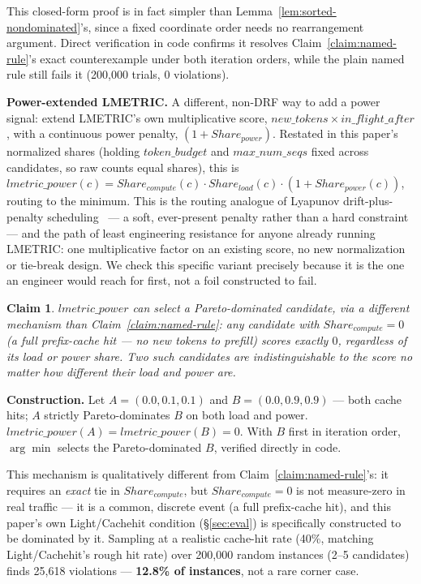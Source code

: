 \documentclass[sigconf,review,anonymous]{acmart}
\newtheorem{claim}{Claim}
\begin{document}
This closed-form proof is in fact simpler than Lemma~\ref{lem:sorted-nondominated}'s, since a
fixed coordinate order needs no rearrangement argument. Direct verification in code confirms
it resolves Claim~\ref{claim:named-rule}'s exact counterexample under both iteration orders,
while the plain named rule still fails it (200{,}000 trials, 0 violations).

\textbf{Power-extended LMETRIC.} A different, non-DRF way to add a power signal: extend
LMETRIC's own multiplicative score, $\mathit{new\_tokens} \times \mathit{in\_flight\_after}$,
with a continuous power penalty, $(1 + \mathit{Share_{power}})$. Restated in this paper's
normalized shares (holding $\mathit{token\_budget}$ and $\mathit{max\_num\_seqs}$ fixed
across candidates, so raw counts equal shares), this is $\mathit{lmetric\_power}(c) =
\mathit{Share_{compute}}(c) \cdot \mathit{Share_{load}}(c) \cdot (1 +
\mathit{Share_{power}}(c))$, routing to the minimum. This is the routing analogue of Lyapunov
drift-plus-penalty scheduling~\cite{neely2010stochastic} --- a soft, ever-present penalty
rather than a hard constraint --- and the path of least engineering resistance for anyone
already running LMETRIC: one multiplicative factor on an existing score, no new normalization
or tie-break design. We check this specific variant precisely because it is the one an
engineer would reach for first, not a foil constructed to fail.

\begin{claim}
\label{claim:lmetric-power}
$\mathit{lmetric\_power}$ can select a Pareto-dominated candidate, via a different mechanism
than Claim~\ref{claim:named-rule}: any candidate with $\mathit{Share_{compute}} = 0$ (a full
prefix-cache hit --- no new tokens to prefill) scores exactly $0$, \emph{regardless of its
load or power share}. Two such candidates are indistinguishable to the score no matter how
different their load and power are.
\end{claim}

\textbf{Construction.} Let $A = (0.0, 0.1, 0.1)$ and $B = (0.0, 0.9, 0.9)$ --- both cache
hits; $A$ strictly Pareto-dominates $B$ on both load and power.
$\mathit{lmetric\_power}(A) = \mathit{lmetric\_power}(B) = 0$. With $B$ first in iteration
order, $\arg\min$ selects the Pareto-dominated $B$, verified directly in code.

This mechanism is qualitatively different from Claim~\ref{claim:named-rule}'s: it requires an
\emph{exact} tie in $\mathit{Share_{compute}}$, but $\mathit{Share_{compute}} = 0$ is not
measure-zero in real traffic --- it is a common, discrete event (a full prefix-cache hit), and
this paper's own Light/Cachehit condition (\S\ref{sec:eval}) is specifically constructed to
be dominated by it. Sampling at a realistic cache-hit rate (40\%, matching Light/Cachehit's
rough hit rate) over 200{,}000 random instances (2--5 candidates) finds 25{,}618 violations
--- \textbf{12.8\% of instances}, not a rare corner case.
\end{document}
